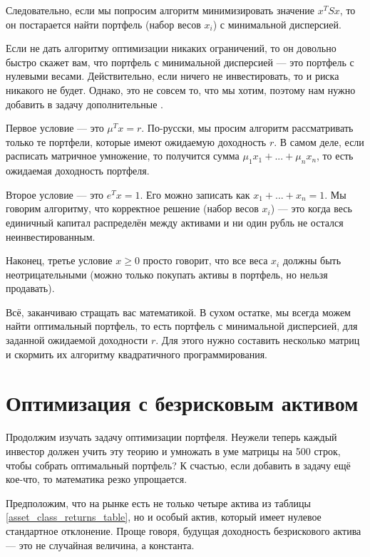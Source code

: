 Следовательно, если мы попросим алгоритм минимизировать значение $x^TSx$, то он постарается найти портфель (набор весов $x_i$) с минимальной дисперсией.

Если не дать алгоритму оптимизации никаких ограничений, то он довольно быстро скажет вам, что портфель с минимальной дисперсией --- это портфель с нулевыми весами. Действительно, если ничего не инвестировать, то и риска никакого не будет. Однако, это не совсем то, что мы хотим, поэтому нам нужно добавить в задачу дополнительные .

Первое условие --- это $\mu^Tx = r$. По-русски, мы просим алгоритм рассматривать только те портфели, которые имеют ожидаемую доходность $r$. В самом деле, если расписать матричное умножение, то получится сумма $\mu_1x_1 + ... + \mu_nx_n$, то есть ожидаемая доходность портфеля.

Второе условие --- это $e^Tx = 1$. Его можно записать как $x_1 + ... + x_n = 1$. Мы говорим алгоритму, что корректное решение (набор весов $x_i$) --- это когда весь единичный капитал распределён между активами и ни один рубль не остался неинвестированным.

Наконец, третье условие $x \ge 0$ просто говорит, что все веса $x_i$ должны быть неотрицательными (можно только покупать активы в портфель, но нельзя продавать).

Всё, заканчиваю стращать вас математикой. В сухом остатке, мы всегда можем найти оптимальный портфель, то есть портфель с минимальной дисперсией, для заданной ожидаемой доходности $r$. Для этого нужно составить несколько матриц и скормить их алгоритму квадратичного программирования.

\section{Оптимизация с безрисковым активом}

Продолжим изучать задачу оптимизации портфеля. Неужели теперь каждый инвестор должен учить эту теорию и умножать в уме матрицы на 500 строк, чтобы собрать оптимальный портфель? К счастью, если добавить в задачу ещё кое-что, то математика резко упрощается.

Предположим, что на рынке есть не только четыре актива из таблицы \ref{asset_class_returns_table}, но и особый  актив, который имеет нулевое стандартное отклонение. Проще говоря, будущая доходность безрискового актива --- это не случайная величина, а константа. 

